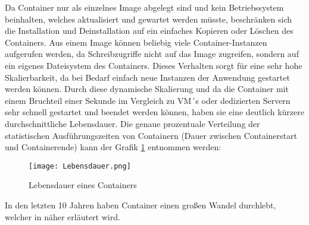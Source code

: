 Da Container nur als einzelnes Image abgelegt sind und kein Betriebssystem beinhalten, welches aktualisiert und gewartet werden müsste, beschränken sich die Installation und Deinstallation auf ein einfaches Kopieren oder Löschen des Containers. 
Aus einem Image können beliebig viele Container-Instanzen aufgerufen werden, da Schreibzugriffe nicht auf das Image zugreifen, sondern auf ein eigenes Dateisystem des Containers. Dieses Verhalten sorgt für eine sehr hohe Skalierbarkeit, da bei Bedarf einfach neue Instanzen der Anwendung gestartet werden können.\cite{12771285120180201}
Durch diese dynamische Skalierung und da die Container mit einem Bruchteil einer Sekunde im Vergleich zu VM´s oder dedizierten Servern sehr schnell gestartet und beendet werden können, haben sie eine deutlich kürzere durchschnittliche Lebensdauer. Die genaue prozentuale Verteilung der statistischen Ausführungszeiten von Containern (Dauer zwischen Containerstart und Containerende) kann der Grafik \ref{fig:HW1} entnommen werden:
\begin{figure}[H]
	\begin{center}
		\texttt{[image: Lebensdauer.png]}
	\end{center}
	\caption[Lebensdauer eines Containers]{Lebensdauer eines Containers \footnotemark}
	\label{fig:HW1}
\end{figure}
In den letzten 10 Jahren haben Container einen großen Wandel durchlebt, welcher in  näher erläutert wird.
\newpage